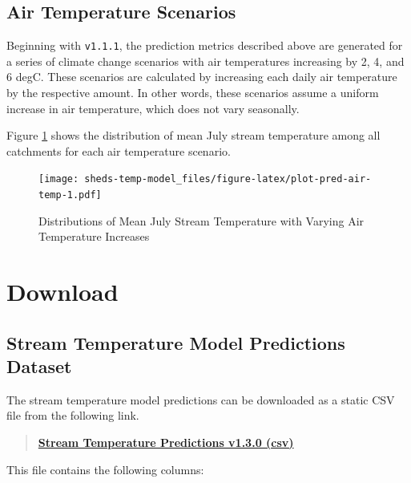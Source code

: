 \documentclass[]{book}
\begin{document}
\hypertarget{air-temperature-scenarios}{%
\section{Air Temperature Scenarios}\label{air-temperature-scenarios}}

Beginning with \texttt{v1.1.1}, the prediction metrics described above are generated for a series of climate change scenarios with air temperatures increasing by 2, 4, and 6 degC. These scenarios are calculated by increasing each daily air temperature by the respective amount. In other words, these scenarios assume a uniform increase in air temperature, which does not vary seasonally.

Figure \ref{fig:plot-pred-air-temp} shows the distribution of mean July stream temperature among all catchments for each air temperature scenario.

\begin{figure}
\centering
\texttt{[image: sheds-temp-model\_files/figure-latex/plot-pred-air-temp-1.pdf]}
\caption{\label{fig:plot-pred-air-temp}Distributions of Mean July Stream Temperature with Varying Air Temperature Increases}
\end{figure}

\hypertarget{download}{%
\chapter{Download}\label{download}}

\hypertarget{stream-temperature-model-predictions-dataset}{%
\section{Stream Temperature Model Predictions Dataset}\label{stream-temperature-model-predictions-dataset}}

The stream temperature model predictions can be downloaded as a static CSV file from the following link.

\begin{quote}
\textbf{\href{https://ecosheds.org/models/stream-temperature/output/sheds-temp-model-v1.3.0.csv}{Stream Temperature Predictions v1.3.0 (csv)}}
\end{quote}

This file contains the following columns:
\end{document}
